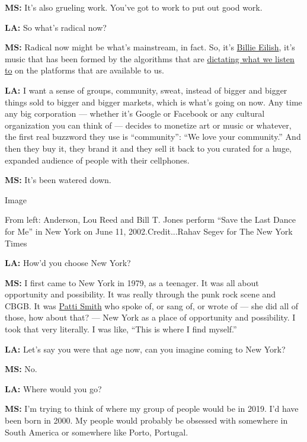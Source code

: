 \textbf{MS:} It's also grueling work. You've got to work to put out good
work.

\textbf{LA:} So what's radical now?

\textbf{MS:} Radical now might be what's mainstream, in fact. So, it's
\href{https://www.nytimes3xbfgragh.onion/2019/03/28/arts/music/billie-eilish-debut-album.html}{Billie
Eilish}, it's music that has been formed by the algorithms that are
\href{https://www.nytimes3xbfgragh.onion/2019/06/23/business/media/stream-classical-music-spotify.html}{dictating
what we listen to} on the platforms that are available to us.

\textbf{LA:} I want a sense of groups, community, sweat, instead of
bigger and bigger things sold to bigger and bigger markets, which is
what's going on now. Any time any big corporation --- whether it's
Google or Facebook or any cultural organization you can think of ---
decides to monetize art or music or whatever, the first real buzzword
they use is ``community'': ``We love your community.'' And then they buy
it, they brand it and they sell it back to you curated for a huge,
expanded audience of people with their cellphones.

\textbf{MS:} It's been watered down.

Image

From left: Anderson, Lou Reed and Bill T. Jones perform ``Save the Last
Dance for Me'' in New York on June 11, 2002.Credit...Rahav Segev for The
New York Times

\textbf{LA:} How'd you choose New York?

\textbf{MS:} I first came to New York in 1979, as a teenager. It was all
about opportunity and possibility. It was really through the punk rock
scene and CBGB. It was
\href{https://www.nytimes3xbfgragh.onion/topic/person/patti-smith}{Patti
Smith} who spoke of, or sang of, or wrote of --- she did all of those,
how about that? --- New York as a place of opportunity and possibility.
I took that very literally. I was like, ``This is where I find myself.''

\textbf{LA:} Let's say you were that age now, can you imagine coming to
New York?

\textbf{MS:} No.

\textbf{LA:} Where would you go?

\textbf{MS:} I'm trying to think of where my group of people would be in
2019. I'd have been born in 2000. My people would probably be obsessed
with somewhere in South America or somewhere like Porto, Portugal.

